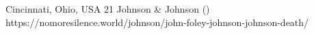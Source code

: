           {Cincinnati, Ohio, USA}
          {21}
          {Johnson \& Johnson }
          {}
          {
             ()
          }
          {https://nomoresilence.world/johnson/john-foley-johnson-johnson-death/}


